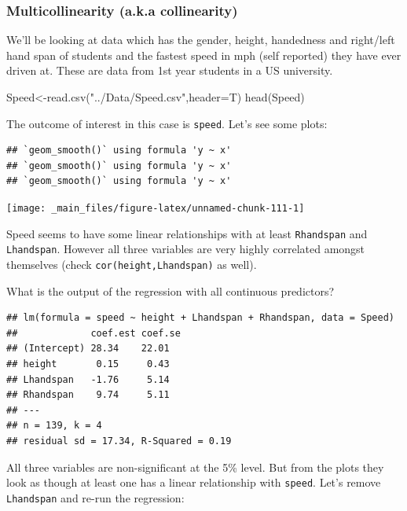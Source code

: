 \documentclass[
]{gitbook}
\newenvironment{Shaded}{\begin{snugshade}}{\end{snugshade}}
\newcommand{\AttributeTok}[1]{\textcolor[rgb]{0.77,0.63,0.00}{#1}}
\newcommand{\FunctionTok}[1]{\textcolor[rgb]{0.00,0.00,0.00}{#1}}
\newcommand{\NormalTok}[1]{#1}
\newcommand{\OtherTok}[1]{\textcolor[rgb]{0.56,0.35,0.01}{#1}}
\newcommand{\StringTok}[1]{\textcolor[rgb]{0.31,0.60,0.02}{#1}}
\begin{document}
\hypertarget{multicollinearity-a.k.a-collinearity}{%
\subsubsection{Multicollinearity (a.k.a collinearity)}\label{multicollinearity-a.k.a-collinearity}}

We'll be looking at data which has the gender, height, handedness and right/left hand span of students and the fastest speed in mph (self reported) they have ever driven at. These are data from 1st year students in a US university.

\begin{Shaded}
\begin{Highlighting}[]
\NormalTok{Speed}\OtherTok{\textless{}{-}}\FunctionTok{read.csv}\NormalTok{(}\StringTok{"../Data/Speed.csv"}\NormalTok{,}\AttributeTok{header=}\NormalTok{T)}
\FunctionTok{head}\NormalTok{(Speed)}
\end{Highlighting}
\end{Shaded}

The outcome of interest in this case is \texttt{speed}. Let's see some plots:

\begin{verbatim}
## `geom_smooth()` using formula 'y ~ x'
## `geom_smooth()` using formula 'y ~ x'
## `geom_smooth()` using formula 'y ~ x'
\end{verbatim}

\begin{center}\texttt{[image: \_main\_files/figure-latex/unnamed-chunk-111-1]} \end{center}

Speed seems to have some linear relationships with at least \texttt{Rhandspan} and \texttt{Lhandspan}. However all three variables are very highly correlated amongst themselves (check \texttt{cor(height,Lhandspan)} as well).

What is the output of the regression with all continuous predictors?

\begin{verbatim}
## lm(formula = speed ~ height + Lhandspan + Rhandspan, data = Speed)
##             coef.est coef.se
## (Intercept) 28.34    22.01  
## height       0.15     0.43  
## Lhandspan   -1.76     5.14  
## Rhandspan    9.74     5.11  
## ---
## n = 139, k = 4
## residual sd = 17.34, R-Squared = 0.19
\end{verbatim}

All three variables are non-significant at the 5\% level. But from the plots they look as though at least one has a linear relationship with \texttt{speed}. Let's remove \texttt{Lhandspan} and re-run the regression:
\end{document}
